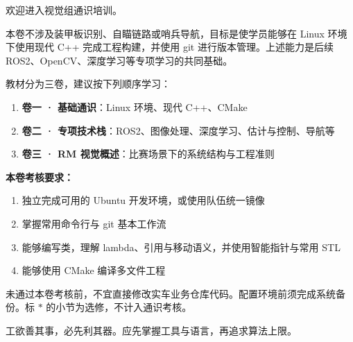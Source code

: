 欢迎进入视觉组通识培训。

本卷不涉及装甲板识别、自瞄链路或哨兵导航，目标是使学员能够在 Linux 环境下使用现代 C++ 完成工程构建，并使用 git 进行版本管理。上述能力是后续 ROS2、OpenCV、深度学习等专项学习的共同基础。

教材分为三卷，建议按下列顺序学习：
\begin{enumerate}
    \item \textbf{卷一 · 基础通识}：Linux 环境、现代 C++、CMake
    \item \textbf{卷二 · 专项技术栈}：ROS2、图像处理、深度学习、估计与控制、导航等
    \item \textbf{卷三 · RM 视觉概述}：比赛场景下的系统结构与工程准则
\end{enumerate}

\textbf{本卷考核要求：}
\begin{enumerate}
    \item 独立完成可用的 Ubuntu 开发环境，或使用队伍统一镜像
    \item 掌握常用命令行与 git 基本工作流
    \item 能够编写类，理解 lambda、引用与移动语义，并使用智能指针与常用 STL
    \item 能够使用 CMake 编译多文件工程
\end{enumerate}

未通过本卷考核前，不宜直接修改实车业务仓库代码。配置环境前须完成系统备份。标 $*$ 的小节为选修，不计入通识考核。

工欲善其事，必先利其器。应先掌握工具与语言，再追求算法上限。
